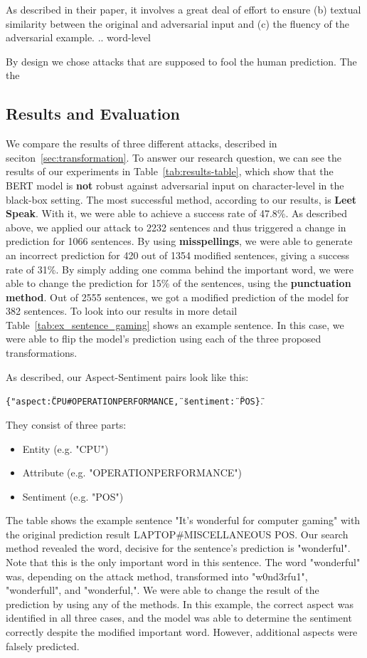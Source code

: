 As described in their paper, it involves a great deal of effort to ensure (b) textual similarity between the original and adversarial input and (c) the fluency of the adversarial example.
.. word-level

By design we chose attacks that are supposed to fool the human prediction. The the

\subsection{Results and Evaluation}
We compare the results of three different attacks, described in seciton~\ref{sec:transformation}. To answer our research question, we can see the results of our experiments in Table~\ref{tab:results-table}, which show that the BERT model is \textbf{not} robust against adversarial input on character-level in the black-box setting.
The most successful method, according to our results, is \textbf{Leet Speak}. With it, we were able to achieve a success rate of 47.8\%. As described above, we applied our attack to 2232 sentences and thus triggered a change in prediction for 1066 sentences. By using \textbf{misspellings}, we were able to generate an incorrect prediction for 420 out of 1354 modified sentences, giving a success rate of 31\%. By simply adding one comma behind the important word, we were able to change the prediction for 15\% of the sentences, using the \textbf{punctuation method}.  Out of 2555 sentences, we got a modified prediction of the model for 382 sentences.
To look into our results in more detail Table~\ref{tab:ex_sentence_gaming} shows an example sentence. In this case, we were able to flip the model's prediction using each of the three proposed transformations.

As described, our Aspect-Sentiment pairs look like this:


\texttt{\{"aspect\":\"CPU\#OPERATION\textunderscore PERFORMANCE\", \"sentiment\": \"POS\"\}}.

They consist of three parts:
\begin{itemize}
\item Entity (e.g. "CPU")
\item Attribute (e.g. "OPERATION\textunderscore PERFORMANCE")
\item Sentiment (e.g. "POS")
\end{itemize}

The table shows the example sentence "It's wonderful for computer gaming" with the original prediction result LAPTOP\#MISCELLANEOUS POS. Our search method revealed the word, decisive for the sentence's prediction is "wonderful". Note that this is the only important word in this sentence. The word "wonderful" was, depending on the attack method, transformed into "w0nd3rfu1", "wonderfull", and "wonderful,". We were able to change the result of the prediction by using any of the methods. In this example, the correct aspect was identified in all three cases, and the model was able to determine the sentiment correctly despite the modified important word. However, additional aspects were falsely predicted. 


